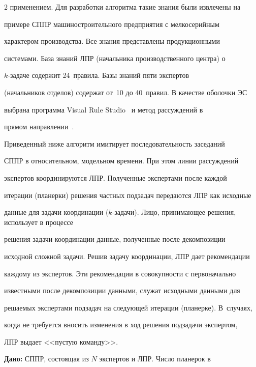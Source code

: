 \begin{multicols}{2}
применением. Для разработки алгоритма такие знания были извлечены на 


примере СППР машиностроительного предприятия с мелкосерийным 


характером производства. Все знания пред\-став\-ле\-ны продукционными 


системами. База знаний ЛПР (начальника производственного центра) о 


  $k$-за\-да\-че содержит 24~правила. Базы знаний пяти экспертов 


(начальников отделов) содержат от~10 до 40~правил. В качестве оболочки ЭС 


выбрана программа Visual Rule Studio~\cite{14kol} и метод рассуждений в 


прямом направлении~\cite{8kol}.


  


  Приведенный ниже алгоритм имитирует последовательность заседаний 


СППР в относительном, модельном времени. При этом линии рассуждений 


экспертов координируются ЛПР. Полученные экспертами после каждой 


итерации (планерки) решения частных подзадач передаются ЛПР как исходные 


данные для задачи координации ($k$-за\-да\-чи). Лицо, принимающее решения, использует в процессе 


решения задачи координации данные, полученные после декомпозиции 


исходной сложной задачи. Решив задачу координации, ЛПР дает рекомендации 


каждому из экспертов. Эти рекомендации в совокупности с первоначально 


известными после декомпозиции  данными, служат исходными данными для 


решаемых экспертами подзадач на следующей итерации (планерке). В~случаях, 


когда не требуется вносить изменения в ход решения подзадачи экспертом, 


ЛПР выдает <<пустую команду>>.





\smallskip


  


\noindent


  \textbf{Дано:} СППР, состоящая из $N$ экспертов и ЛПР. Число планерок в 



\end{multicols}
